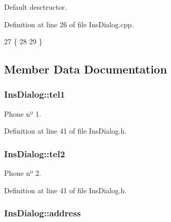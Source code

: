 Default desctructor. 



Definition at line 26 of file Ins\+Dialog.\+cpp.


\begin{DoxyCode}
27 \{
28     
29 \}
\end{DoxyCode}


\subsection{Member Data Documentation}
\hypertarget{class_ins_dialog_a7dc562149fa67417983c78fe2621d7f9}{
\subsubsection[{tel1}]{\setlength{\rightskip}{0pt plus 5cm}Ins\+Dialog\+::tel1\hspace{0.3cm}{\ttfamily [private]}}}\label{class_ins_dialog_a7dc562149fa67417983c78fe2621d7f9}


Phone nº 1. 



Definition at line 41 of file Ins\+Dialog.\+h.

\hypertarget{class_ins_dialog_a79832ba6767602ed1d07b9b707bbfd1f}{
\subsubsection[{tel2}]{\setlength{\rightskip}{0pt plus 5cm}Ins\+Dialog\+::tel2\hspace{0.3cm}{\ttfamily [private]}}}\label{class_ins_dialog_a79832ba6767602ed1d07b9b707bbfd1f}


Phone nº 2. 



Definition at line 41 of file Ins\+Dialog.\+h.

\hypertarget{class_ins_dialog_a14da50d5cdf18e266b1d198ebbd20770}{
\subsubsection[{address}]{\setlength{\rightskip}{0pt plus 5cm}Ins\+Dialog\+::address\hspace{0.3cm}{\ttfamily [private]}}}\label{class_ins_dialog_a14da50d5cdf18e266b1d198ebbd20770}


